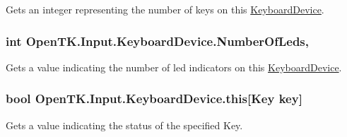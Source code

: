 Gets an integer representing the number of keys on this \hyperlink{class_open_t_k_1_1_input_1_1_keyboard_device}{Keyboard\-Device}. 

\hypertarget{class_open_t_k_1_1_input_1_1_keyboard_device_a72f5d5169869c62419219ddbb4ae0077}{
\subsubsection[{Number\-Of\-Leds}]{\setlength{\rightskip}{0pt plus 5cm}int Open\-T\-K.\-Input.\-Keyboard\-Device.\-Number\-Of\-Leds\hspace{0.3cm}{\ttfamily [get]}, {\ttfamily [set]}}}\label{class_open_t_k_1_1_input_1_1_keyboard_device_a72f5d5169869c62419219ddbb4ae0077}


Gets a value indicating the number of led indicators on this \hyperlink{class_open_t_k_1_1_input_1_1_keyboard_device}{Keyboard\-Device}. 

\hypertarget{class_open_t_k_1_1_input_1_1_keyboard_device_a3ae0bcae2f72d9e593a1abd58f3510a4}{
\subsubsection[{this[Key key]}]{\setlength{\rightskip}{0pt plus 5cm}bool Open\-T\-K.\-Input.\-Keyboard\-Device.\-this\mbox{[}{\bf Key} key\mbox{]}\hspace{0.3cm}{\ttfamily [get]}}}\label{class_open_t_k_1_1_input_1_1_keyboard_device_a3ae0bcae2f72d9e593a1abd58f3510a4}


Gets a value indicating the status of the specified Key. 


